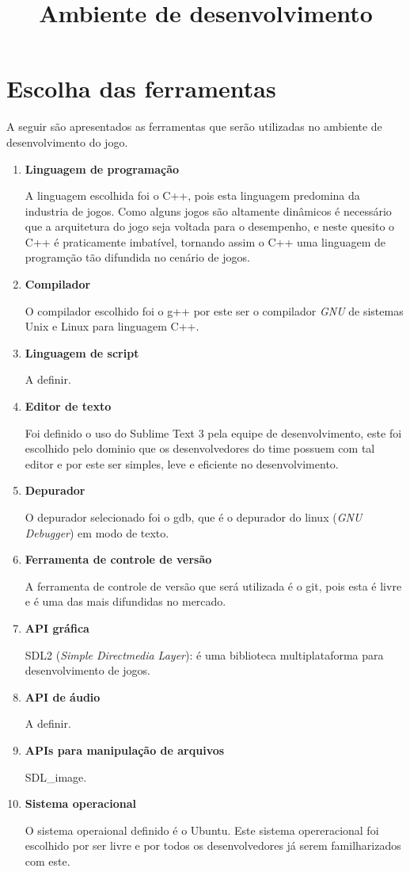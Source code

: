 \documentclass[a4paper, 11pt]{article} %
\title{\textbf{Ambiente de desenvolvimento}} %
\makeatletter
\renewcommand{\maketitle}{ %
\begin{center} %
{\LARGE\@title} %

\vspace{20pt} %

\end{center}
}
\makeatother
\begin{document}
\maketitle %


\section*{Escolha das ferramentas}

A seguir são apresentados as ferramentas que serão utilizadas no ambiente de desenvolvimento do jogo.

\begin{enumerate}
\item \textbf{Linguagem de programação}

A linguagem escolhida foi o C++, pois esta linguagem predomina da industria de jogos. Como alguns jogos são altamente dinâmicos é necessário que a arquitetura do jogo seja voltada para o desempenho, e neste quesito o C++ é praticamente imbatível, tornando assim o C++ uma linguagem de programção tão difundida no cenário de jogos.

\item \textbf{Compilador}

O compilador escolhido foi o g++ por este ser o compilador \textit{GNU} de sistemas Unix e Linux para linguagem C++.
\item \textbf{Linguagem de script}

A definir.
\item \textbf{Editor de texto}

Foi definido o uso do Sublime Text 3 pela equipe de desenvolvimento, este foi escolhido pelo dominio que os desenvolvedores do time possuem com tal editor e por este ser simples, leve e eficiente no desenvolvimento.
\item \textbf{Depurador}

O depurador selecionado foi o  gdb, que é o depurador do linux (\textit{GNU Debugger}) em modo de texto.
\item \textbf{Ferramenta de controle de versão}

A ferramenta de controle de versão que será utilizada é o git, pois esta é livre e é uma das mais difundidas no mercado.
\item \textbf{API gráfica}

SDL2 (\textit{Simple Directmedia Layer}): é uma biblioteca multiplataforma para desenvolvimento de jogos.
\item \textbf{API de áudio}

A definir.
\item \textbf{APIs para manipulação de arquivos}

SDL\_image.
\item \textbf{Sistema operacional}

O sistema operaional definido é o Ubuntu. Este sistema opereracional foi escolhido por ser livre e por todos os desenvolvedores já serem familharizados com este.

\end{enumerate}
\end{document}
